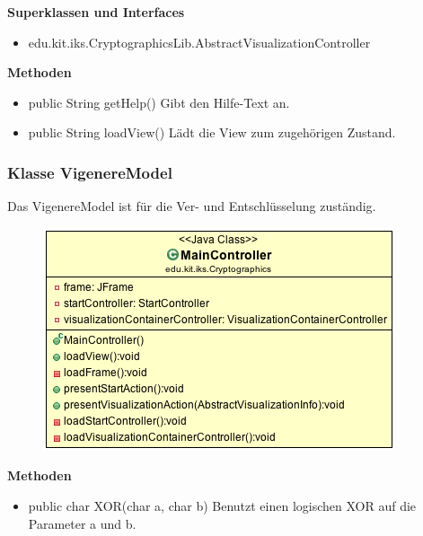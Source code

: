 \documentclass{article}
\begin{document}
      \textbf{Superklassen und Interfaces}
      \begin{itemize}
        \item edu.kit.iks.CryptographicsLib.AbstractVisualizationController
      \end{itemize}
      
      \textbf{Methoden}
      \begin{itemize}
        \item public String getHelp() \newline
        Gibt den Hilfe-Text an.
        \item public String loadView() \newline
        Lädt die View zum zugehörigen Zustand.
      \end{itemize}

    \subsubsection{Klasse VigenereModel}
      Das VigenereModel ist für die Ver- und Entschlüsselung zuständig.
      \begin{figure}[H]
        \centering
        \includegraphics[width=\textwidth]{resources/edu-kit-iks-Cryptographics-MainController}
      \end{figure}
      
      \textbf{Methoden}
      \begin{itemize}
        \item public char XOR(char a, char b) \newline
        Benutzt einen logischen XOR auf die Parameter a und b.
      \end{itemize}
\end{document}

